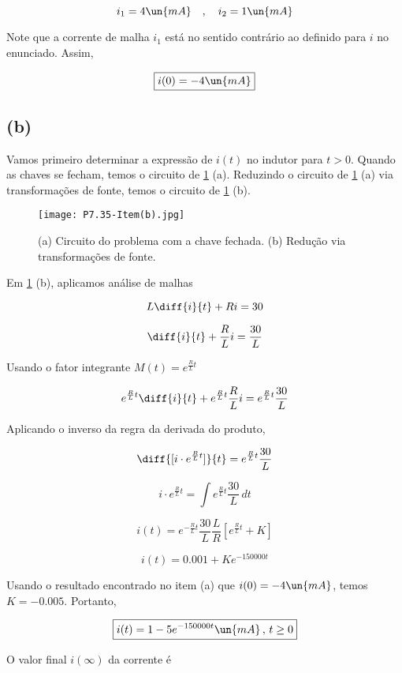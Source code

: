 \endgroup

\[ i_1 = 4 \un{mA} \quad , \quad i_2 = 1 \un{mA}   \]

Note que a corrente de malha $i_1$ está no sentido contrário ao definido para $i$ no enunciado. Assim, 

\[ \boxed{i(0) = - 4 \un{mA}}  \]

\subsection*{(b)}

Vamos primeiro determinar a expressão de $i(t)$ no indutor para $t>0$. Quando as chaves se fecham, temos o circuito
de \ref*{fig:7.35.1} (a). Reduzindo o circuito de \ref*{fig:7.35.1} (a) via transformações de fonte, 
temos o circuito de \ref*{fig:7.35.1} (b).

\begin{figure}[hb]
    \centering
    \caption{(a) Circuito do problema com a chave fechada. (b) Redução via transformações de fonte.}
      \centering
      \texttt{[image: P7.35-Item(b).jpg]} \\
    \label{fig:7.35.1}
\end{figure}

Em \ref*{fig:7.35.1} (b), aplicamos análise de malhas   

\[ L\diff{i}{t} + Ri = 30 \]

\[ \diff{i}{t} + \frac{R}{L}i = \frac{30}{L} \]

Usando o fator integrante $M(t) = e^{\frac{R}{L}t}$

\[ e^{\frac{R}{L}t}\diff{i}{t} + e^{\frac{R}{L}t}\frac{R}{L}i = e^{\frac{R}{L}t}\frac{30}{L} \]

Aplicando o inverso da regra da derivada do produto,

\[ \diff{[i \cdot e^{\frac{R}{L}t}]}{t} = e^{\frac{R}{L}t}\frac{30}{L} \]

\[ i \cdot e^{\frac{R}{L}t} = \int e^{\frac{R}{L}t}\frac{30}{L} \, dt  \]

\[ i(t)  = e^{- \frac{R}{L}t} \frac{30}{L} \frac{L}{R} \left[e^{\frac{R}{L}t} + K\right] \]

\[ i(t)  = 0.001 + Ke^{- 150000t} \]

Usando o resultado encontrado no item (a) que $i(0) = - 4 \un{mA}$, temos $K = - 0.005$. Portanto,   

\[ \boxed{i(t) = 1 - 5e^{- 150000t} \un{mA} \, , \, t \geq 0}  \]

O valor final $i(\infty)$ da corrente é    

